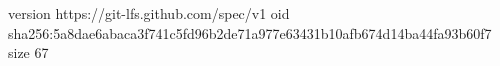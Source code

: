version https://git-lfs.github.com/spec/v1
oid sha256:5a8dae6abaca3f741c5fd96b2de71a977e63431b10afb674d14ba44fa93b60f7
size 67
